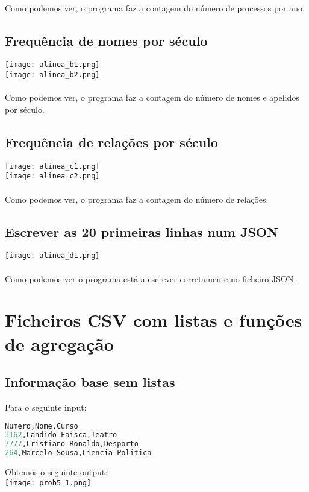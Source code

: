\documentclass[11pt,a4paper]{report}
\begin{document}
    \paragraph{}
    Como podemos ver, o programa faz a contagem do número de processos por ano.
    
    \subsection{Frequência de nomes por século}
    \texttt{[image: alinea\_b1.png]} \\
	\texttt{[image: alinea\_b2.png]}
    \paragraph{}
    Como podemos ver, o programa faz a contagem do número de nomes e apelidos por século.

    \subsection{Frequência de relações por século}
    \texttt{[image: alinea\_c1.png]} \\
    \texttt{[image: alinea\_c2.png]}

    \paragraph{}
    Como podemos ver, o programa faz a contagem do número de relações.

    \subsection{Escrever as 20 primeiras linhas num JSON}
    \texttt{[image: alinea\_d1.png]} \\
    \paragraph{}
    Como podemos ver o programa está a escrever corretamente no ficheiro JSON.

\section{Ficheiros CSV com listas e funções de agregação}
    \subsection{Informação base sem listas} 
    Para o seguinte input:
\begin{lstlisting}[language=Python]
Numero,Nome,Curso
3162,Candido Faisca,Teatro
7777,Cristiano Ronaldo,Desporto
264,Marcelo Sousa,Ciencia Politica
\end{lstlisting}
Obtemos o seguinte output: \\
\texttt{[image: prob5\_1.png]} \\
\end{document}
